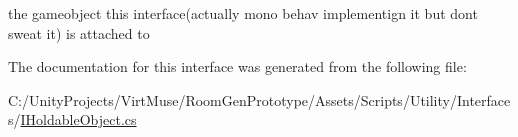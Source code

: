 the gameobject this interface(actually mono behav implementign it but don\textquotesingle{}t sweat it) is attached to 



The documentation for this interface was generated from the following file\+:\begin{DoxyCompactItemize}
\item 
C\+:/\+Unity\+Projects/\+Virt\+Muse/\+Room\+Gen\+Prototype/\+Assets/\+Scripts/\+Utility/\+Interfaces/\mbox{\hyperlink{_i_holdable_object_8cs}{I\+Holdable\+Object.\+cs}}\end{DoxyCompactItemize}
